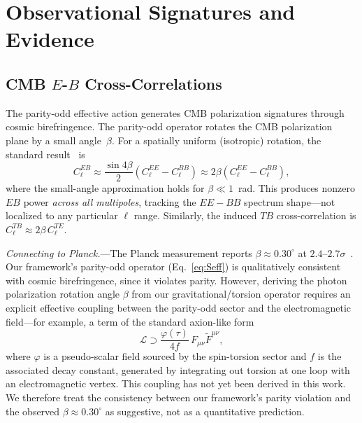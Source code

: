 \documentclass[aps,prd,twocolumn,superscriptaddress,showpacs,preprintnumbers,nofootinbib,longbibliography,floatfix]{revtex4-2}
\begin{document}
\section{Observational Signatures and Evidence}\label{sec:obs}

\subsection{CMB $E$-$B$ Cross-Correlations}\label{sec:EB}

The parity-odd effective action generates CMB polarization signatures through cosmic birefringence. The parity-odd operator rotates the CMB polarization plane by a small angle~$\beta$. For a spatially uniform (isotropic) rotation, the standard result~\cite{Minami2020} is
\begin{equation}\label{eq:ClEB}
C_\ell^{EB}\approx \frac{\sin 4\beta}{2}\left(C_\ell^{EE}-C_\ell^{BB}\right) \approx 2\beta\left(C_\ell^{EE}-C_\ell^{BB}\right),
\end{equation}
where the small-angle approximation holds for $\beta\ll 1$~rad. This produces nonzero $EB$ power \textit{across all multipoles}, tracking the $EE-BB$ spectrum shape---not localized to any particular $\ell$ range. Similarly, the induced $TB$ cross-correlation is $C_\ell^{TB}\approx 2\beta\,C_\ell^{TE}$.

\textit{Connecting to Planck.}---The Planck measurement reports $\beta \approx 0.30^\circ$ at $2.4$--$2.7\sigma$~\cite{Minami2020,Eskilt2022}. Our framework's parity-odd operator (Eq.~\ref{eq:Seff}) is qualitatively consistent with cosmic birefringence, since it violates parity. However, deriving the photon polarization rotation angle $\beta$ from our gravitational/torsion operator requires an explicit effective coupling between the parity-odd sector and the electromagnetic field---for example, a term of the standard axion-like form
\begin{equation}\label{eq:axionFF}
\mathcal{L}\supset \frac{\varphi(\tau)}{4f}\,F_{\mu\nu}\tilde{F}^{\mu\nu},
\end{equation}
where $\varphi$ is a pseudo-scalar field sourced by the spin-torsion sector and $f$ is the associated decay constant, generated by integrating out torsion at one loop with an electromagnetic vertex. This coupling has not yet been derived in this work. We therefore treat the consistency between our framework's parity violation and the observed $\beta\approx 0.30^\circ$ as suggestive, not as a quantitative prediction.
\end{document}
